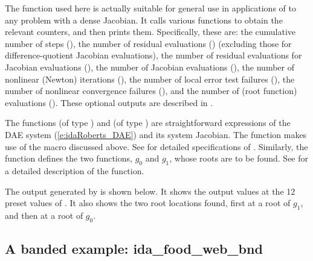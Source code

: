 The function  used here is actually suitable for
general use in applications of {\ida} to any problem with a dense
Jacobian.  It calls various  
functions to obtain the relevant counters, and then prints them.
Specifically, these are: the cumulative number of steps (), 
the number of residual evaluations () (excluding those for
difference-quotient Jacobian evaluations),
the number of residual evaluations for Jacobian evaluations (),
the number of Jacobian evaluations (),
the number of nonlinear (Newton) iterations (),
the number of local error test failures (),
the number of nonlinear convergence failures (),
and the number of  (root function) evaluations ().
These optional outputs are described in .

The functions  (of type ) and  (of type
) are straightforward expressions of the DAE system
(\ref{e:idaRoberts_DAE}) and its system Jacobian.  The function 
makes use of the macro  discussed above.  See 
for detailed specifications of .  Similarly, the function
 defines the two functions, $g_0$ and $g_1$, whose roots are
to be found.  See  for a detailed description of the
 function.

The output generated by  is shown below.  It shows the output
values at the 12 preset values of .  It also shows the two root
locations found, first at a root of $g_1$, and then at a root of $g_0$.

\subsection{A banded example: ida\_food\_web\_bnd}\label{ss:idaFoodWeb}


